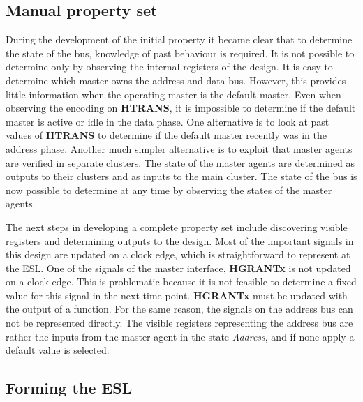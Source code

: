 \subsection{Manual property set}
During the development of the initial property it became clear that to determine the state of the bus, knowledge of past behaviour is required. It is not possible to determine only by observing the internal registers of the design. It is easy to determine which master owns the address and
data bus. However, this provides little information when the operating master is the default master. Even when observing the encoding on \textbf{HTRANS}, it is impossible to determine if the default master is active or idle in the data phase. One alternative is to look at past values of \textbf{HTRANS} to determine if the default master recently was in the address phase. Another much simpler alternative is to exploit that master agents are verified in separate clusters. The
state of the master agents are determined as outputs to their clusters and as inputs to the main cluster. The state of the bus is now possible to determine at any time by observing the states of the master agents. \par
The next steps in developing a complete property set include discovering visible registers and determining outputs to the design. Most of the important signals
in this design are updated on a clock edge, which is straightforward to represent at the ESL. One of the signals of the master interface, \textbf{HGRANTx} is 
not updated on a clock edge. This is problematic because it is not feasible to determine a fixed value for this signal in the next time point. \textbf{HGRANTx} 
must be updated with the output of a function. For the same reason, the signals on the address bus can not be represented directly. The visible registers 
representing the address bus are rather the inputs from the master agent in the state \textit{Address}, and if none apply a default value is selected. 

\subsection{Forming the ESL}
 




